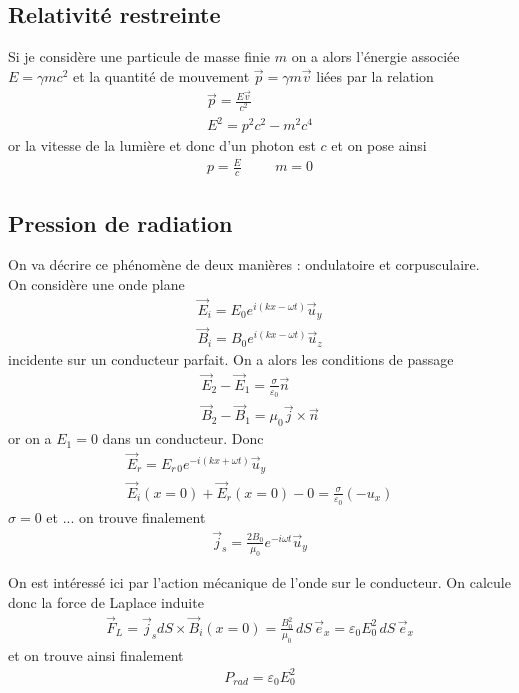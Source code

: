 \documentclass[12pt,prb,aps,epsf]{article}
\begin{document}
\subsection{Relativité restreinte}
Si je considère une particule de masse finie $m$ on a alors l'énergie associée $E = \gamma mc^2$ et la quantité de mouvement $\vec{p} = \gamma m \vec{v}$ liées par la relation
\begin{eqnarray}
\vec{p} = \frac{E\vec{v}}{c^2}\\E^2 = p^2c^2 - m^2c^4
\end{eqnarray}
or la vitesse de la lumière et donc d'un photon est $c$ et on pose ainsi 
\begin{eqnarray}
p = \frac{E}{c}\hspace{1cm} m =0
\end{eqnarray}

\subsection{Pression de radiation}
On va décrire ce phénomène de deux manières : ondulatoire et corpusculaire.\\

On considère une onde plane 
\begin{eqnarray}
\vec{E}_i = E_0 e^{i(kx-\omega t)}\vec{u}_y\\
\vec{B}_i = B_0 e^{i(kx-\omega t)}\vec{u}_z
\end{eqnarray}
incidente sur un conducteur parfait. On a alors les conditions de passage 
\begin{eqnarray}
\vec{E}_2 - \vec{E}_1 = \frac{\sigma}{\varepsilon_0}\vec{n}\\
\vec{B}_2 - \vec{B}_1 = \mu_0\vec{j}\times\vec{n}
\end{eqnarray}
or on a $E_1= 0 $ dans un conducteur. Donc 
\begin{eqnarray}
\vec{E}_r = E_{r\,0}e^{-i(kx + \omega t)}\vec{u}_y\\
\vec{E}_i(x=0) + \vec{E}_r(x=0) - 0 = \frac{\sigma}{\varepsilon_0}(-u_x)
\end{eqnarray}
$\sigma = 0$ et ... on trouve finalement 
\begin{eqnarray}
\vec{j}_s = \frac{2B_0}{\mu_0}e^{-i\omega t}\vec{u}_y
\end{eqnarray}

On est intéressé ici par l'action mécanique de l'onde sur le conducteur. On calcule donc la force de Laplace induite 
\begin{eqnarray}
\vec{F}_L = \vec{j}_s dS \times \vec{B}_i(x=0) = \frac{B^2_0}{\mu_0}\,dS\,\vec{e}_x = \varepsilon_0 E_0^2 \,dS\,\vec{e}_x
\end{eqnarray}
 et on trouve ainsi finalement 
\begin{eqnarray}
P_{rad} = \varepsilon_0 E_0^2
\end{eqnarray}
\end{document}
